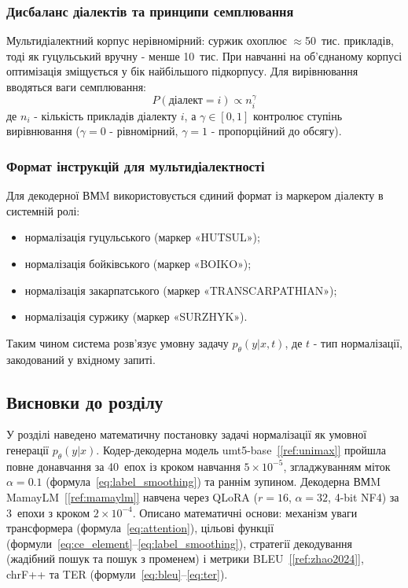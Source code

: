 \documentclass[14pt]{extarticle}
\newcommand{\citeref}[1]{\hyperref[#1]{[\ref*{#1}]}}
\begin{document}
\subsubsection{Дисбаланс діалектів та принципи семплювання}

Мультидіалектний корпус нерівномірний: суржик охоплює $\approx$50~тис. прикладів, тоді як гуцульський вручну - менше 10~тис. При навчанні на об'єднаному корпусі оптимізація зміщується у бік найбільшого підкорпусу. Для вирівнювання вводяться ваги семплювання:
\begin{equation}
  P(\text{діалект} = i) \propto n_i^\gamma
  \label{eq:sampling}
\end{equation}
де $n_i$ - кількість прикладів діалекту $i$, а $\gamma \in [0, 1]$ контролює ступінь вирівнювання ($\gamma = 0$ - рівномірний, $\gamma = 1$ - пропорційний до обсягу).

\subsubsection{Формат інструкцій для мультидіалектності}

Для декодерної ВМM використовується єдиний формат із маркером діалекту в системній ролі:
\begin{itemize}
  \item нормалізація гуцульського (маркер «HUTSUL»);
  \item нормалізація бойківського (маркер «BOIKO»);
  \item нормалізація закарпатського (маркер «TRANSCARPATHIAN»);
  \item нормалізація суржику (маркер «SURZHYK»).
\end{itemize}

Таким чином система розв'язує умовну задачу $p_\theta(y|x, t)$, де $t$ - тип нормалізації, закодований у вхідному запиті.

\subsection{Висновки до розділу}

У розділі наведено математичну постановку задачі нормалізації як умовної генерації $p_\theta(y|x)$. Кодер-декодерна модель umt5-base~\citeref{ref:unimax} пройшла повне донавчання за 40~епох із кроком навчання $5 \times 10^{-5}$, згладжуванням міток $\alpha = 0.1$ (формула~\ref{eq:label_smoothing}) та раннім зупином. Декодерна ВМM MamayLM~\citeref{ref:mamaylm} навчена через QLoRA ($r = 16$, $\alpha = 32$, 4-bit NF4) за 3~епохи з кроком $2 \times 10^{-4}$. Описано математичні основи: механізм уваги трансформера (формула~\ref{eq:attention}), цільові функції (формули~\ref{eq:ce_element}--\ref{eq:label_smoothing}), стратегії декодування (жадібний пошук та пошук з променем) і метрики BLEU~\citeref{ref:zhao2024}, chrF++ та TER (формули~\ref{eq:bleu}--\ref{eq:ter}).
\end{document}
